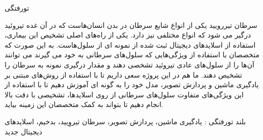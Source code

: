 

\pagestyle{empty}

‌تورفتگی

سرطان تیررویید یکی از انواع شایع سرطان در بدن انسان‌هاست که در آن غده تیروئید درگیر می شود که انواع مختلفی نیز دارد.
یکی از راه‌های اصلی تشخیص این بیماری، استفاده از اسلاید‌های دیجیتال ثبت شده از نمونه ای از سلول‌هاست.
به این صورت که متخصصان با استفاده از ویژگی‌هایی که سلول‌های سرطانی به خود می گیرند می توانند آن‌ها را از سلول‌های عادی تیروئید تشخصی دهند و مقدار درگیری نمونه به سرطان را تشخیص دهند.
ما هم در این پروژه سعی داریم تا با استفاده از روش‌های مبتنی بر یادگیری ماشین و پردازش تصویر، مدل خود را به گونه ای آموزش دهیم تا با استفاده از این ویژگی‌های متفاوت سلول‌های سرطانی از روی اسلاید‌ها، تشخیصی با دقت بالا انجام دهیم تا بتواند به کمک متخصصان این زمینه بیاید.

‌بلند
‌تورفتگی :
یادگیری ماشین، پردازش تصویر، سرطان تیروِیید، بدخیم، اسلاید‌های دیجیتال
‌جدید
